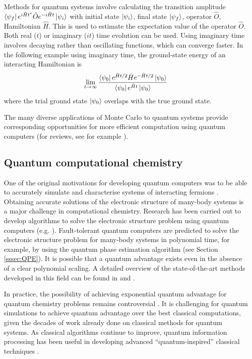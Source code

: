 \documentclass[10pt]{iopart}
\begin{document}
Methods for quantum systems involve calculating the transition amplitude $\bra{\psi_f} e^{i\hat{H}t^*} \hat{O} e^{-i\hat{H}t} \ket{\psi_i}$ with initial state $\ket{\psi_i}$, final state $\ket{\psi_f}$, operator $\hat{O}$, Hamiltonian $\hat{H}$.  This is used to estimate the expectation value of the operator $\hat{O}$.
Both real ($t$) or imaginary ($it$) time evolution can be used.  Using imaginary time involves decaying rather than oscillating functions, which can converge faster. In the following example using imaginary time, the ground-state energy of an interacting Hamiltonian is
\begin{equation}
\lim_{t\to\infty} \frac{\bra{\psi_0} e^{\hat{H}t/2} \hat{H} e^{-\hat{H}t/2} \ket{\psi_0}}{\bra{\psi_0} e^{\hat{H}t} \ket{\psi_0}}
\end{equation}
where the trial ground state $\ket{\psi_0}$ overlaps with the true ground state. 

The many diverse applications of Monte Carlo to quantum systems provide corresponding opportunities for more efficient computation using quantum computers (for reviews, see for example \cite{Ceperley1986,Foulkes2001}).


\subsection{Quantum computational chemistry}

One of the original motivations for developing quantum computers was to be able to accurately simulate and characterise systems of interacting fermions \cite{Abrams1997,ortiz2001quantum}. 
Obtaining accurate solutions of the electronic structure of many-body systems is a major challenge in computational chemistry. Research has been carried out to develop algorithms to solve the electronic structure problem using quantum computers (e.g. \cite{Lin2022,Huggins2022,Somma2019}). Fault-tolerant quantum computers are predicted to solve the electronic structure problem for many-body systems \cite{Cao2019} in polynomial time, for example, by using the quantum phase estimation algorithm \cite{AspuruGuzik2005,Abrams1997,Kitaev1996} (see Section \ref{sssec:QPE}). It is possible that a quantum advantage exists even in the absence of a clear polynomial scaling. A detailed overview of the state-of-the-art methods developed in this field can be found in \cite{Cao2019} and \cite{McArdle2020}.

In practice, the possibility of achieving exponential quantum advantage for quantum chemistry problems remains controversial \cite{Lee2023c}.  It is challenging for quantum simulations to achieve quantum advantage over the best classical computations, given the decades of work already done on classical methods for quantum systems. As classical algorithms continue to improve, quantum information processing has been useful in developing advanced ``quantum-inspired'' classical techniques \cite{Arrazola2019}.  
\end{document}
